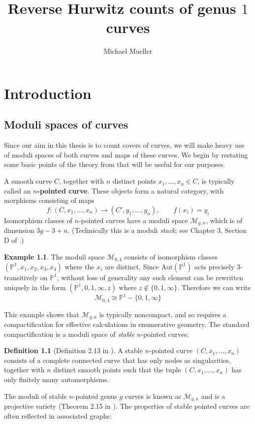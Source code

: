 \documentclass[thesis]{thesis-umich}           %
\title{Reverse Hurwitz counts of genus $1$ curves}
\author{Michael Mueller}
\newcommand{\Aut}{\text{Aut}}
\renewcommand{\P}{\mathbb P}
\theoremstyle{definition}
\newtheorem{dfn}[thm]{Definition}
\newtheorem{eg}[thm]{Example}
\begin{document}
\chapter{Introduction}

\section{Moduli spaces of curves}

Since our aim in this thesis is to count covers of curves, we
will make heavy use of moduli spaces of both curves and maps
of these curves. We begin by restating some basic points of the theory
from \cite{Moduli}
that will be useful for our purposes.

A smooth curve $C$, together with $n$ distinct
points $x_1,\dots,x_n\in C$, is typically called an {\bf $n$-pointed curve}.
These objects form a natural category, with morphisms
consisting of maps
\[
f:(C,x_1,\dots,x_n)\to (C',y_1,\dots,y_n),\qquad f(x_i)=y_i
\]
Isomorphism classes of $n$-pointed curves have a moduli space
$\mathcal M_{g,n}$, which is of dimension $3g-3+n$.
(Technically this is a moduli {\it stack}; see Chapter 3, Section D of
\cite{Moduli}.)

\begin{eg}
  The moduli space $\mathcal M_{0,4}$ consists of isomorphism classes
  $(\P^1,x_1,x_2,x_3,x_4)$ where the $x_i$ are distinct.
  Since $\Aut(\P^1)$ acts precisely $3$-transitively on $\P^1$,
  without loss of generality any such element can be rewritten uniquely
  in the form $(\P^1,0,1,\infty,z)$ where $z\notin\{0,1,\infty\}$.
  Therefore we can write
  \[
  \mathcal M_{0,4}\cong\P^1-\{0,1,\infty\}
  \]
\end{eg}

This example shows that $\mathcal M_{g,n}$ is typically noncompact,
and so requires a compactification for effective calculations in
enumerative geometry. The standard compactification is a moduli
space of {\it stable} $n$-pointed curves:

\begin{dfn}[Definition 2.13 in \cite{Moduli}]
  A stable $n$-pointed curve $(C,x_1,\dots,x_n)$ consists of
  a complete connected curve that has only nodes as singularities, together
  with $n$ distinct smooth points such that the tuple $(C,x_1,\dots,x_n)$
  has only finitely many automorphisms.
\end{dfn}

The moduli of stable $n$-pointed genus $g$ curves is known as $\overline{\mathcal M}_{g,n}$ and is a projective variety (Theorem 2.15 in \cite{Moduli}).
The properties of stable pointed curves are often reflected in associated graphs:
\end{document}
